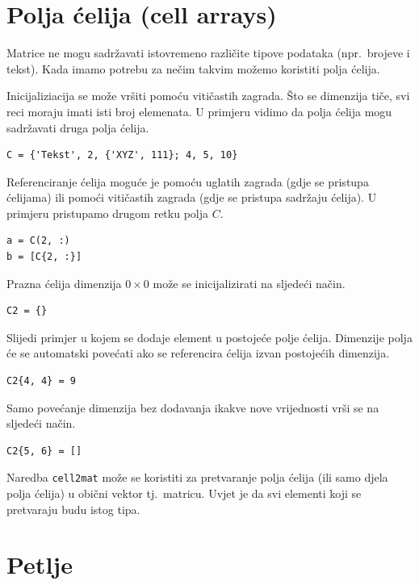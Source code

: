 \documentclass[a4paper, 10pt]{article}
\begin{document}
\section{Polja ćelija (cell arrays)}

Matrice ne mogu sadržavati istovremeno različite tipove podataka (npr.\ brojeve i tekst). Kada imamo potrebu za nečim takvim možemo koristiti polja ćelija.

Inicijaliziacija se može vršiti pomoću vitičastih zagrada. Što se dimenzija tiče, svi reci moraju imati isti broj elemenata. U primjeru vidimo da polja ćelija mogu sadržavati druga polja ćelija.

\begin{lstlisting}
C = {'Tekst', 2, {'XYZ', 111}; 4, 5, 10}
\end{lstlisting}

Referenciranje ćelija moguće je pomoću uglatih zagrada (gdje se pristupa ćelijama) ili pomoći vitičastih zagrada (gdje se pristupa sadržaju ćelija). U primjeru pristupamo drugom retku polja $C$. 

\begin{lstlisting}
a = C(2, :)
b = [C{2, :}]
\end{lstlisting}

Prazna ćelija dimenzija $0 \times 0$ može se inicijalizirati na sljedeći način.

\begin{lstlisting}
C2 = {}
\end{lstlisting}

Slijedi primjer u kojem se dodaje element u postojeće polje ćelija. Dimenzije polja će se automatski povećati ako se referencira ćelija izvan postojećih dimenzija.

\begin{lstlisting}
C2{4, 4} = 9
\end{lstlisting}

Samo povećanje dimenzija bez dodavanja ikakve nove vrijednosti vrši se na sljedeći način.

\begin{lstlisting}
C2{5, 6} = []
\end{lstlisting}

Naredba \texttt{cell2mat} može se koristiti za pretvaranje polja ćelija (ili samo djela polja ćelija) u obični vektor tj.\ matricu. Uvjet je da svi elementi koji se pretvaraju budu istog tipa.

\section{Petlje}
\end{document}
